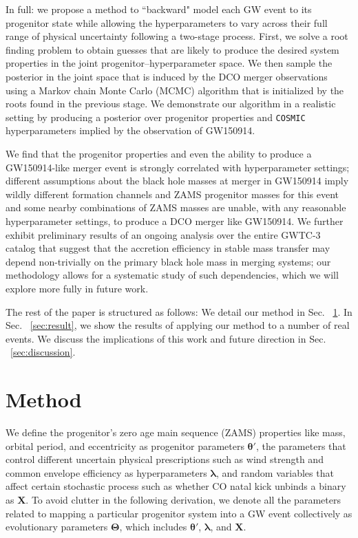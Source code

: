 \documentclass[twocolumn]{aastex631}
\begin{document}
In full: we propose a method to ``backward" model each GW event to its
progenitor state while allowing the hyperparameters to vary across their full
range of physical uncertainty following a two-stage process. First, we solve a
root finding problem to obtain guesses that are likely to produce the desired
system properties in the joint progenitor--hyperparameter space. We then sample
the posterior in the joint space that is induced by the DCO merger observations
using a Markov chain Monte Carlo (MCMC) algorithm that is initialized by the
roots found in the previous stage.  We demonstrate our algorithm in a realistic
setting by producing a posterior over progenitor properties and \texttt{COSMIC}
hyperparameters implied by the observation of GW150914.  

We find that the progenitor properties and even the ability to produce a
GW150914-like merger event is strongly correlated with hyperparameter settings;
different assumptions about the black hole masses at merger in GW150914 imply
wildly different formation channels and ZAMS progenitor masses for this event
and some nearby combinations of ZAMS masses are unable, with any reasonable
hyperparameter settings, to produce a DCO merger like GW150914.  We further
exhibit preliminary results of an ongoing analysis over the entire GWTC-3
catalog \citep{GWTC-3} that suggest that the accretion efficiency in stable mass
transfer may depend non-trivially on the primary black hole mass in merging
systems; our methodology allows for a systematic study of such dependencies,
which we will explore more fully in future work.

The rest of the paper is structured as follows: We detail our method in Sec.
~\ref{sec:method}. In Sec. ~\ref{sec:result}, we show the results of applying
our method to a number of real events. We discuss the implications of this work
and future direction in Sec. ~\ref{sec:discussion}.

\section{Method}
\label{sec:method}


We define the progenitor's zero age main sequence (ZAMS) properties like mass,
orbital period, and eccentricity as progenitor parameters $\bm{\theta'}$, the
parameters that control different uncertain physical prescriptions such as wind
strength and common envelope efficiency as hyperparameters $\bm{\lambda}$, and
random variables that affect certain stochastic process such as whether CO natal
kick unbinds a binary as $\bm{X}$. To avoid clutter in the following derivation,
we denote all the parameters related to mapping a particular progenitor system
into a GW event collectively as evolutionary parameters $\bm{\Theta}$, which
includes $\bm{\theta'}$, $\bm{\lambda}$, and $\bm{X}$.
\end{document}
